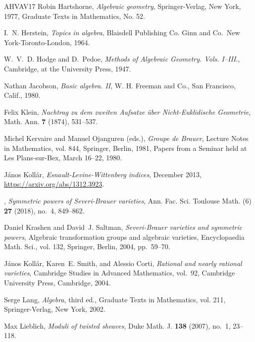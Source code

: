 \documentclass{amsart}
\theoremstyle{definition}
\theoremstyle{remark}
\begin{document}
\begin{thebibliography}{AHVAV17}
Robin Hartshorne, \emph{Algebraic geometry}, Springer-Verlag, New York, 1977,
  Graduate Texts in Mathematics, No. 52. 

I.~N. Herstein, \emph{Topics in algebra}, Blaisdell Publishing Co. Ginn and
  Co.\, New York-Toronto-London, 1964. 

W.~V.~D. Hodge and D.~Pedoe, \emph{Methods of {A}lgebraic {G}eometry. {V}ols.
  {I--III.}}, Cambridge, at the University Press, 1947. 

Nathan Jacobson, \emph{Basic algebra. {II}}, W. H. Freeman and Co., San
  Francisco, Calif., 1980. 

Felix Klein, \emph{Nachtrag zu dem zweiten {A}ufsatze {\"u}ber
  {N}icht-{E}uklidische {G}eometrie}, {Math. Ann.} \textbf{7} (1874), 531--537.

Michel Kervaire and Manuel Ojanguren (eds.), \emph{Groupe de {B}rauer}, Lecture
  Notes in Mathematics, vol. 844, Springer, Berlin, 1981, Papers from a Seminar
  held at Les Plans-sur-Bex, March 16--22, 1980. 

J{\'a}nos Koll{\'a}r, \emph{{Esnault-Levine-Wittenberg indices}}, December
  2013, \url{https://arxiv.org/abs/1312.3923}.

\bysame, \emph{Symmetric powers of {S}everi-{B}rauer varieties}, Ann. Fac. Sci.
  Toulouse Math. (6) \textbf{27} (2018), no.~4, 849--862. 

Daniel Krashen and David~J. Saltman, \emph{Severi-{B}rauer varieties and
  symmetric powers}, Algebraic transformation groups and algebraic varieties,
  Encyclopaedia Math. Sci., vol. 132, Springer, Berlin, 2004, pp.~59--70.

J{\'a}nos Koll{\'a}r, Karen~E. Smith, and Alessio Corti, \emph{Rational and
  nearly rational varieties}, Cambridge Studies in Advanced Mathematics,
  vol.~92, Cambridge University Press, Cambridge, 2004.

Serge Lang, \emph{Algebra}, third ed., Graduate Texts in Mathematics, vol. 211,
  Springer-Verlag, New York, 2002. 

Max Lieblich, \emph{Moduli of twisted sheaves}, Duke Math. J. \textbf{138}
  (2007), no.~1, 23--118. 


\end{thebibliography}
\end{document}
